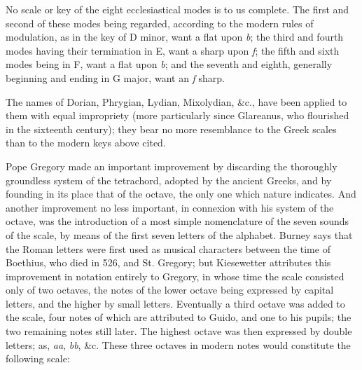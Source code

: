 No scale or key of the eight ecclesiastical modes is to us complete. The first
and second of these modes being regarded, according to the modern rules of
modulation, as in the key of D minor, want a flat upon \textit{b}; the third and fourth
modes having their termination in E, want a sharp upon \textit{f}; the fifth and sixth
modes being in F, want a flat upon \textit{b}; and the seventh and eighth, generally
beginning and ending in G major, want an \textit{f} sharp.

The names of Dorian, Phrygian, Lydian, Mixolydian, \&c., have been applied to
them with equal impropriety (more particularly since Glareanus, who flourished
in the sixteenth century); they bear no more resemblance to the Greek scales than
to the modern keys above cited.

Pope Gregory made an important improvement by discarding the thoroughly
groundless system of the tetrachord, adopted by the ancient Greeks, %
and by
founding in its place that of the octave, the only one which nature indicates. And
another improvement no less important, in connexion with his system of the
octave, was the introduction of a most simple nomenclature of the seven sounds of
the scale, by means of the first seven letters of the alphabet. Burney says that the
Roman letters were first used as musical characters between the time of Boethius, %
who died in 526, and St. Gregory; but Kiesewetter %
attributes this improvement
in notation entirely to Gregory, in whose time the scale consisted only of two \pagebreak
octaves, the notes of the lower octave being expressed by capital letters, and the 
higher by small letters. Eventually a third octave was added to the scale, four 
notes of which are attributed to Guido, and one to his pupils; the two remaining 
notes still later. The highest octave was then expressed by double letters; as, \textit{aa},
\textit{bb}, \&c. These three octaves in modern notes would constitute the following scale:

